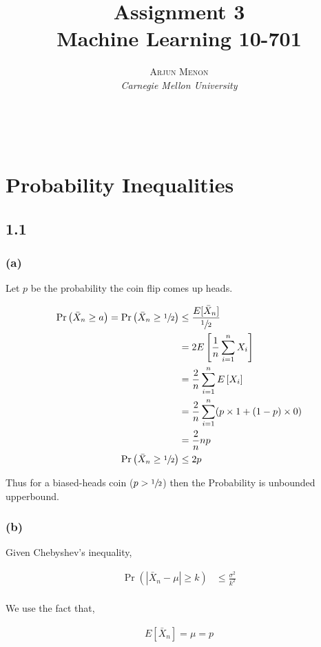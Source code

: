 \documentclass[letterpaper,10pt]{article} %
\title{\textbf{Assignment 3}\\ %
Machine Learning 10-701} %
\author{\textsc{Arjun Menon} %
\\{\textit{Carnegie Mellon University}}} %
\makeatletter
\newcommand{\pr}[1]{\Pr\left( #1 \right)}
\renewcommand{\maketitle}{ %
\begin{flushright} %
{\LARGE\@title} %

{\large\@author} %
\\\@date %

\end{flushright}
}
\makeatother
\begin{document}
\maketitle %

\section{Probability Inequalities}

\subsection{1.1}

\subsubsection*{(a)}

Let $p$ be the probability the coin flip comes up heads.

\begin{align*}
\pr{\bar{X}_n \geq a} = \pr{\bar{X}_n \geq \sfrac{1}{2}} &\leq \frac{E[\bar{X}_n]}{\sfrac{1}{2}} \\
&= 2 E\left[ \frac{1}{n} \sum^n_{i=1} X_i \right] \\
&= \frac{2}{n} \sum^n_{i=1} E\left[ X_i \right] \\
&= \frac{2}{n} \sum^n_{i=1} (p \times 1 + (1-p) \times 0) \\
&= \frac{2}{n} n p \\
\pr{\bar{X}_n \geq \sfrac{1}{2}} &\leq 2p \\
\end{align*}

Thus for a biased-heads coin ($ p>\sfrac{1}{2} $) then the Probability is unbounded upperbound.

\subsubsection*{(b)}

Given Chebyshev's inequality,

\begin{align*}
\pr{\left|\bar{X}_n - \mu\right| \geq k} &\leq \frac{\sigma^2}{k^2}\\
\end{align*}

We use the fact that,

\begin{align*}
E\left[ \bar{X}_n \right] = \mu = p\\
\end{align*}
\end{document}
